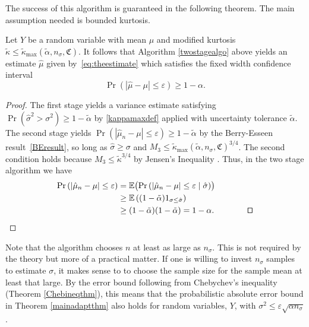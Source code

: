 \documentclass[graybox]{svmult}
\newcommand{\fudge}{\mathfrak{C}}
\newcommand\e{\mathbb{E}}
\newcommand{\Prob}{\Pr}
\newcommand{\abs}[1]{\left|#1\right|}
\newcommand{\hmu}{\hat{\mu}}
\newcommand{\hsigma}{\hat{\sigma}}
\newcommand{\tkappa}{\tilde{\kappa}}
\def\abs#1{\ensuremath{\left \lvert #1 \right \rvert}}
\begin{document}
\bigskip

The success of this algorithm is guaranteed in the following theorem.  The main assumption needed is bounded kurtosis.

\begin{theorem} \label{mainadaptthm} 
Let $Y$ be a random variable with mean $\mu$ and modified kurtosis $\tkappa \le \tilde\kappa_{\max}(\tilde\alpha,n_\sigma,\fudge)$.  It follows that Algorithm \ref{twostagealgo} above yields an estimate
$\hat\mu$ given by~\eqref{eq:theestimate} which satisfies the fixed width confidence interval
$$\Pr( |\hat\mu-\mu|\le\varepsilon)\ge 1-\alpha.$$
\end{theorem}
\begin{proof}
\smartqed  
The first stage yields a variance estimate satisfying
$
\Pr( \hsigma^2 >\sigma^2)\ge 1-\tilde\alpha
$
by \eqref{kappamaxdef} applied with uncertainty tolerance $\tilde\alpha$.
The second stage yields
$\Pr( |\hat\mu_n-\mu|\le\varepsilon)\ge 1-\tilde\alpha$
by the Berry-Esseen result~\eqref{BEresult},
so long as $\hat\sigma\ge\sigma$
and $M_3\le \tilde\kappa_{\max}(\tilde\alpha,n_\sigma,\fudge)^{3/4}$.
The second condition holds because $M_3 \le \tkappa^{3/4}$ by Jensen's Inequality \citep[8.4.b]{LinBai10a}.
Thus, in the two stage algorithm we have
\begin{align*}
\Prob\left(\abs{\hmu_n-\mu} \le \varepsilon \right) &
= \e\bigl(\Prob\left(\abs{\hmu_n-\mu} \le \varepsilon \mid \hsigma \right) \bigr) \\
& \ge \e\left((1-\tilde\alpha) 1_{\sigma\le\hsigma}\right)\\
& \ge (1-\tilde\alpha) (1-\tilde\alpha) = 1-\alpha.\qquad \qquad \qed
\end{align*}
\end{proof}

\begin{remark} Note that the algorithm chooses $n$ at least as large as $n_\sigma$.  This is not required by the theory but more of a practical matter.  If one is willing to invest $n_\sigma$ samples to estimate $\sigma$, it makes sense to to choose the sample size for the sample mean at least that large.  By the error bound following from Chebychev's inequality (Theorem \ref{Chebineqthm}), this means that the probabilistic absolute error bound in Theorem \ref{mainadaptthm} also holds for random variables, $Y$, with $\sigma^2 \le \varepsilon \sqrt{\alpha n_{\sigma}}$.
\end{remark}

\bigskip
\end{document}
